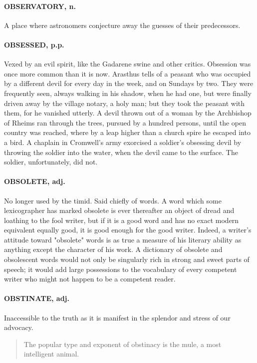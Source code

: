 \documentclass[11pt]{article}
\begin{document}
\paragraph{OBSERVATORY, n.}  A place where astronomers conjecture away the guesses
of their predecessors.

\paragraph{OBSESSED, p.p.}  Vexed by an evil spirit, like the Gadarene swine and
other critics.  Obsession was once more common than it is now.
Arasthus tells of a peasant who was occupied by a different devil for
every day in the week, and on Sundays by two.  They were frequently
seen, always walking in his shadow, when he had one, but were finally
driven away by the village notary, a holy man; but they took the
peasant with them, for he vanished utterly.  A devil thrown out of a
woman by the Archbishop of Rheims ran through the trees, pursued by a
hundred persons, until the open country was reached, where by a leap
higher than a church spire he escaped into a bird.  A chaplain in
Cromwell's army exorcised a soldier's obsessing devil by throwing the
soldier into the water, when the devil came to the surface.  The
soldier, unfortunately, did not.

\paragraph{OBSOLETE, adj.}  No longer used by the timid.  Said chiefly of words.
A word which some lexicographer has marked obsolete is ever thereafter
an object of dread and loathing to the fool writer, but if it is a
good word and has no exact modern equivalent equally good, it is good
enough for the good writer.  Indeed, a writer's attitude toward
"obsolete" words is as true a measure of his literary ability as
anything except the character of his work.  A dictionary of obsolete
and obsolescent words would not only be singularly rich in strong and
sweet parts of speech; it would add large possessions to the
vocabulary of every competent writer who might not happen to be a
competent reader.

\paragraph{OBSTINATE, adj.}  Inaccessible to the truth as it is manifest in the
splendor and stress of our advocacy.
\begin{quote}   The popular type and exponent of obstinacy is the mule, a most \\
intelligent animal. \end{quote}
\end{document}
